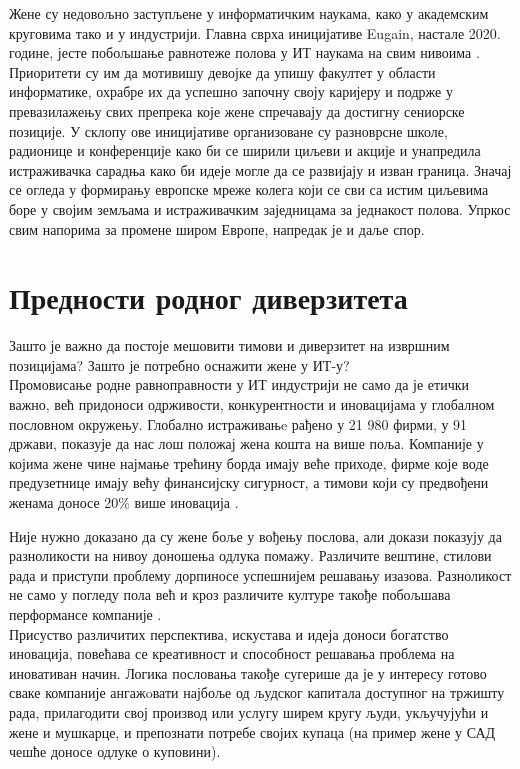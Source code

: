 \documentclass[a4paper]{article}
\begin{document}
Жене су недовољно заступљене у информатичким наукама, како у академским 
круговима тако и у индустрији. Главна сврха иницијативе Eugain, настале 2020. 
године, јесте побољшање равнотеже полова у ИТ наукама на свим нивоима \cite{eugain}. Приоритети 
су им да мотивишу девојке да упишу факултет у области информатике, охрабре их 
да успешно започну своју каријеру и подрже у превазилажењу свих препрека које жене 
спречавају да достигну сениорске позиције. У склопу ове иницијативе организоване 
су разноврсне школе, радионице и конференције како би се ширили циљеви и акције и 
унапредила истраживачка сарадња како би идеје могле да се развијају и изван граница. 
Значај се огледа у формирању европске мреже колега који се сви са истим циљевима 
боре у својим земљама и истраживачким заједницама за једнакост полова. Упркос 
свим напорима за промене широм Европе, напредак је и даље спор.

\section{Предности родног диверзитета} 
\label{sec:prednosti}
Зашто је важно да постоје мешовити тимови и диверзитет на извршним позицијама? 
Зашто је потребно оснажити жене у ИТ-у? \\
Промовисање родне равноправности у ИТ индустрији не само да је етички важно, већ придоноси 
одрживости, конкурентности и иновацијама у глобалном пословном окружењу. Глобално истраживањe 
рађено у 21 980 фирми, у 91 држави, показује да нас лош положај жена кошта на више поља.
Компаније у којима жене чине најмање трећину борда имају веће приходе, фирме
које воде предузетнице имају већу финансијску сигурност, а тимови који су предвођени
женама доносе 20\% више иновација \cite{prednosti}. 

Није нужно доказано да су жене боље у вођењу послова, али докази показују да разноликости 
на нивоу доношења одлука помажу. Различите вештине, стилови рада и приступи проблему 
дорпиносе успешнијем решавању изазова. Разноликост не само у погледу пола већ и 
кроз различите културе такође побољшава перформансе компаније \cite{kultura}.\\ 

Присуство различитих перспектива, искустава и идеја доноси богатство иновација, 
повећава се креативност и способност решавања проблема на иновативан начин. 
Логика пословања такође сугерише да је у интересу готово сваке компаније 
ангажoвати најбоље од људског капитала доступног на тржишту рада, прилагодити свој
производ или услугу ширем кругу људи, укључујући и жене и мушкарце, и препознати
потребе својих купаца (на пример жене у САД чешће доносе одлуке о куповини).
\end{document}
